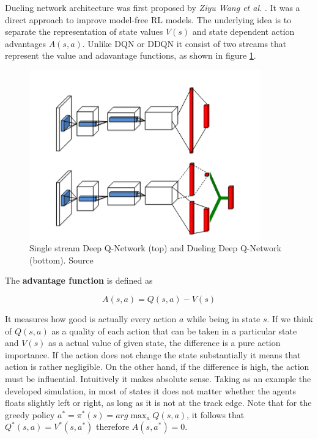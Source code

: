 Dueling network architecture was first proposed by \emph{Ziyu Wang  et al.} \cite{DBLP:journals/corr/WangFL15}. It was a direct approach to 
improve model-free RL models. The underlying idea is to separate the representation of state values $V(s)$ and state dependent action 
advantages $A(s, a)$. Unlike DQN or DDQN it consist of two streams that represent the value and adavantage functions, as shown in figure \ref{fig:single-vs-dueling-q-network}.

\begin{figure}[h]
    \centering
    \includegraphics[width=10cm]{img/dueling_vs_single_qn.png}
    \caption{Single stream Deep Q-Network (top) and Dueling Deep Q-Network (bottom). Source \cite{DBLP:journals/corr/WangFL15}}
    \label{fig:single-vs-dueling-q-network}
\end{figure}

The \textbf{advantage function} is defined as

\begin{equation}
    A(s, a) = Q(s, a) - V(s)
\label{eq:advantage}
\end{equation}

It measures how good is actually every action $a$ while being in state $s$. If we think of $Q(s, a)$ as a quality of each action that can be
taken in a particular state and $V(s)$ as a actual value of given state, the difference is a pure action importance. If the action does not 
change the state substantially it means that action is rather negligible. On the other hand, if the difference is high, the action must be
influential. Intuitively it makes absolute sense. Taking as an example the developed simulation, in most of states it does not matter whether the
agents floats slightly left or right, as long as it is not at the track edge. Note that for the greedy policy $a^* = \pi^*(s) =
arg\max_aQ(s, a)$, it follows that $Q^*(s, a) = V^*(s, a^*)$ therefore $A(s, a^*) = 0$.


